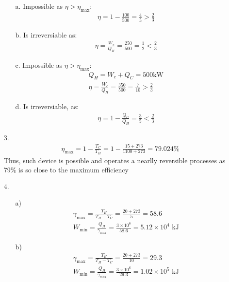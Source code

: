 \documentclass{article}
\begin{document}
\begin{itemize}
    \begin{itemize}
        \item [a.] Impossible as \(\eta>\eta_{\text{max}}\):
        \begin{align*}
            \eta = 1-\frac{100}{500}=\frac{4}{5}>\frac{2}{3}
        \end{align*}
        \item [b.] Is irreversiable as:
        \begin{align*}
            \eta = \frac{W_{c}}{Q_H} = \frac{250}{500} =\frac{1}{2}<\frac{2}{3} 
        \end{align*}
        \item [c.] Impossible as \(\eta>\eta_{\text{max}}\):
        \begin{align*}
            Q_H = W_{c}+Q_C = 500 \text{kW}\\
            \eta = \frac{W_c}{Q_H} = \frac{350}{500} = \frac{7}{10}>\frac{2}{3}
        \end{align*}
        \item [d.] Is irreversiable, as:
        \begin{align*}
            \eta = 1-\frac{Q_C}{Q_H} = \frac{3}{5}<\frac{2}{3}
        \end{align*}
    \end{itemize}
    \item [3.]
    \begin{align*}
        \eta_{\text{max}} = 1-\frac{T_C}{T_H} = 1-\frac{15+273}{1100+273} = 79.024\%
    \end{align*}
    Thus, such device is possible and operates a nearlly reversible processes as 79\% is so close to the maximum efficiency
    \newpage
    \item [4.]
    \begin{itemize}
        \item [a)]
        \begin{align*}
            \gamma_{\text{max}}=\frac{T_H}{T_H-T_C} = \frac{20+273}{5} = 58.6\\
            W_{\text{min}} = \frac{Q_H}{\gamma_{\text{max}}} = \frac{3\times 10^6}{58.6} = 5.12\times10^4\text{ kJ}
        \end{align*}
        \item [b)]
        \begin{align*}
            \gamma_{\text{max}}=\frac{T_H}{T_H-T_C} = \frac{20+273}{10} = 29.3\\
            W_{\text{min}} = \frac{Q_H}{\gamma_{\text{max}}} = \frac{3\times 10^6}{29.3} = 1.02\times10^5\text{ kJ}

\end{align*}
\end{itemize}
\end{itemize}
\end{document}
